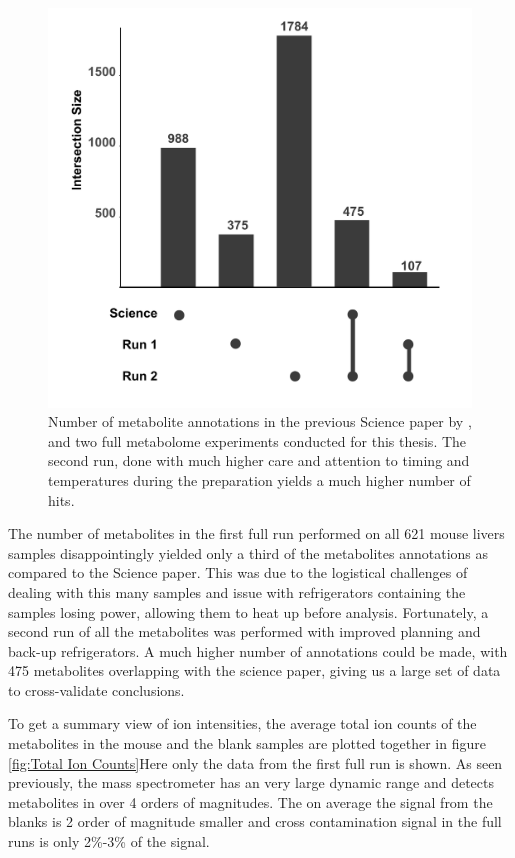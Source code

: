 \documentclass[a4paper]{book}
\begin{document}
\begin{figure}[bht!]
		\centering
		\includegraphics[width=0.7\linewidth]{3.Metabolomics/Metabolite_Set_Overlap}
		\caption{ Number of metabolite annotations in the previous Science paper by \citeauthor{Williams2016SystemsFunction}, and two full metabolome experiments conducted for this thesis. The second run, done with much higher care and attention to timing and temperatures during the preparation yields a much higher number of hits.}
		\label{fig:Unique Metabolite Annotations}
\end{figure}

The number of metabolites in the first full run performed on all 621 mouse livers samples disappointingly yielded only a third of the metabolites annotations as compared to the Science paper. This was due to the logistical challenges of dealing with this many samples and issue with refrigerators containing the samples losing power, allowing them to heat up before analysis. Fortunately, a second run of all the metabolites was performed with improved planning and back-up refrigerators. A much higher number of annotations could be made, with 475 metabolites overlapping with the science paper, giving us a large set of data to cross-validate conclusions.
	
To get a summary view of ion intensities, the average total ion counts of the metabolites in the mouse and the blank samples are plotted together in figure \ref{fig:Total Ion Counts}Here only the data from the first full run is shown. As seen previously, the mass spectrometer has an very large dynamic range and detects metabolites in over 4 orders of magnitudes. The on average the signal from the blanks is 2 order of magnitude smaller and cross contamination signal in the full runs is only 2\%-3\% of the signal.
	
\end{document}
